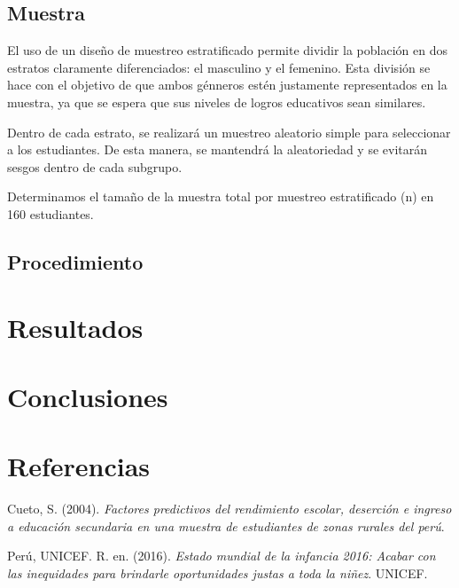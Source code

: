 \documentclass[
]{article}
\newlength{\cslhangindent}
\newenvironment{CSLReferences}[2] %
 {\begin{list}{}{%
  \setlength{\itemindent}{0pt}
  \setlength{\leftmargin}{0pt}
  \setlength{\parsep}{0pt}
  \ifodd #1
   \setlength{\leftmargin}{\cslhangindent}
   \setlength{\itemindent}{-1\cslhangindent}
  \fi
  \setlength{\itemsep}{#2\baselineskip}}}
 {\end{list}}
\begin{document}
\subsection*{Muestra}\label{muestra}

El uso de un diseño de muestreo estratificado permite dividir la
población en dos estratos claramente diferenciados: el masculino y el
femenino. Esta división se hace con el objetivo de que ambos génneros
estén justamente representados en la muestra, ya que se espera que sus
niveles de logros educativos sean similares.

Dentro de cada estrato, se realizará un muestreo aleatorio simple para
seleccionar a los estudiantes. De esta manera, se mantendrá la
aleatoriedad y se evitarán sesgos dentro de cada subgrupo.

Determinamos el tamaño de la muestra total por muestreo estratificado
(n) en 160 estudiantes.

\subsection*{Procedimiento}\label{procedimiento}

\section*{Resultados}\label{resultados}

\section*{Conclusiones}\label{conclusiones}

\newpage

\section*{Referencias}\label{referencias}

\label{refs}
\begin{CSLReferences}{1}{0}
Cueto, S. (2004). \emph{Factores predictivos del rendimiento escolar,
deserci{ó}n e ingreso a educaci{ó}n secundaria en una muestra de
estudiantes de zonas rurales del per{ú}}.

Perú, UNICEF. R. en. (2016). \emph{Estado mundial de la infancia 2016:
Acabar con las inequidades para brindarle oportunidades justas a toda la
niñez}. UNICEF.

\end{CSLReferences}
\end{document}
